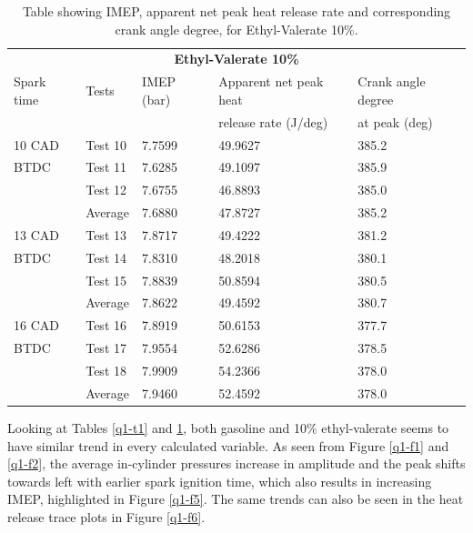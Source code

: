 \documentclass[11pt]{article}
\begin{document}
\begin{table}[H]
    \begin{center}
    \begin{tabular}{@{}l l l l l@{}}
        \toprule
        \multicolumn{5}{c}{\textbf{Ethyl-Valerate 10\%}}\\
        Spark time & Tests & IMEP (bar) & Apparent net peak heat & Crank angle degree\\
        & & & release rate (\si{\joule}/deg) & at peak (deg)\\
        \midrule
        10 CAD  & Test 10   & 7.7599    & 49.9627   & 385.2\\
        BTDC    & Test 11   & 7.6285    & 49.1097   & 385.9\\
                & Test 12   & 7.6755    & 46.8893   & 385.0\\
                & Average   & 7.6880    & 47.8727   & 385.2\\
        13 CAD  & Test 13   & 7.8717    & 49.4222   & 381.2\\
        BTDC    & Test 14   & 7.8310    & 48.2018   & 380.1\\
                & Test 15   & 7.8839    & 50.8594   & 380.5\\
                & Average   & 7.8622    & 49.4592   & 380.7\\
        16 CAD  & Test 16   & 7.8919    & 50.6153   & 377.7\\
        BTDC    & Test 17   & 7.9554    & 52.6286   & 378.5\\
                & Test 18   & 7.9909    & 54.2366   & 378.0\\
                & Average   & 7.9460    & 52.4592   & 378.0\\
        \bottomrule
    \end{tabular}
    \caption{Table showing IMEP, apparent net peak heat release rate and corresponding crank angle degree, for Ethyl-Valerate 10\%.}
    \label{q1-t2}
\end{center}
\end{table}
Looking at Tables \ref{q1-t1} and \ref{q1-t2}, both gasoline and 10\% ethyl-valerate seems to have similar trend in every calculated variable.  As seen from Figure \ref{q1-f1} and \ref{q1-f2}, the average in-cylinder pressures increase in amplitude and the peak shifts towards left with earlier spark ignition time, which also results in increasing IMEP, highlighted in Figure \ref{q1-f5}. The same trends can also be seen in the heat release trace plots in Figure \ref{q1-f6}.  
\end{document}
